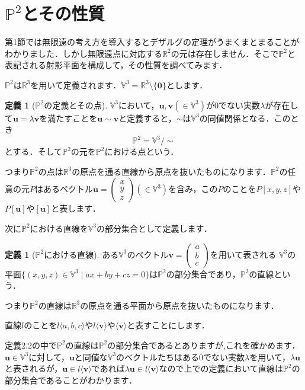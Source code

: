 \documentclass{jsarticle}
\theoremstyle{definition}
\newtheorem{definition}[theorem]{定義}
\numberwithin{theorem}{section}
\numberwithin{equation}{section}
\begin{document}
\section{$\mathbb{P}^2$とその性質}

第1節では無限遠の考え方を導入するとデザルグの定理がうまくまとまることがわかりました．しかし無限遠点に対応する$\mathbb{R}^2$の元は存在しません．そこで$\mathbb{P}^2$と表記される射影平面を構成して，その性質を調べてみます．
\par $\mathbb{P}^2$は$\mathbb{R}^3$を用いて定義されます．$\mathbb{V}^3=\mathbb{R}^3\setminus\{\bm{0}\}$とします．
\begin{definition}[$\mathbb{P}^2$の定義とその点]
$\mathbb{V}^3$において，$\bm{u},\bm{v}(\in \mathbb{V}^3)$が0でない実数$\lambda$が存在して$\bm{u}=\lambda\bm{v}$を満たすことを$\bm{u}\sim \bm{v}$と定義すると，$\sim$は$\mathbb{V}^3$の同値関係となる．このとき$$\mathbb{P}^2=\mathbb{V}^3\slash{\sim}$$とする．そして$\mathbb{P}^2$の元を$\mathbb{P}^2$における点という．
\end{definition}
つまり$\mathbb{P}^2$の点は$\mathbb{R}^3$の原点を通る直線から原点を抜いたものになります．$\mathbb{P}^2$の任意の元$P$はあるベクトル$\bm{u}=\begin{pmatrix} x \\ y \\ z \end{pmatrix}(\in \mathbb{V}^3)$を含み，この$P$のことを$P[x,y,z]$や$P[\bm{u}]$や$[\bm{u}]$と表します．
\par 次に$\mathbb{P}^2$における直線を$\mathbb{V}^3$の部分集合として定義します．
\begin{definition}[$\mathbb{P}^2$における直線]
ある$\mathbb{V}^3$のベクトル$\bm{v}=\begin{pmatrix}a\\b\\c \end{pmatrix}$を用いて表される
$\mathbb{V}^3$の平面$\{(x,y,z)\in \mathbb{V}^3\mid ax+by+cz=0\}$は$\mathbb{P}^2$の部分集合であり，$\mathbb{P}^2$の直線という．
\end{definition}
つまり$\mathbb{P}^2$の直線は$\mathbb{R}^3$の原点を通る平面から原点を抜いたものになります．
\par 直線$l$のことを$l\langle a,b,c\rangle $や$l\langle \bm{v}\rangle $や$\langle \bm{v}\rangle $と表すことにします．
\par 定義2.2の中で$\mathbb{P}^2$の直線は$\mathbb{P}^2$の部分集合であるとありますが,これを確かめます．$\bm{u}\in\mathbb{V}^3$に対して，$\bm{u}$と同値な$\mathbb{V}^3$のベクトルたちはある0でない実数$\lambda$を用いて，$\lambda \bm{u}$と表されるが，$\bm{u}\in l\langle \bm{v}\rangle $であれば$\lambda\bm{u}\in l\langle \bm{v}\rangle $なので上での定義において直線は$\mathbb{P}^2$の部分集合であることがわかります．
\end{document}
